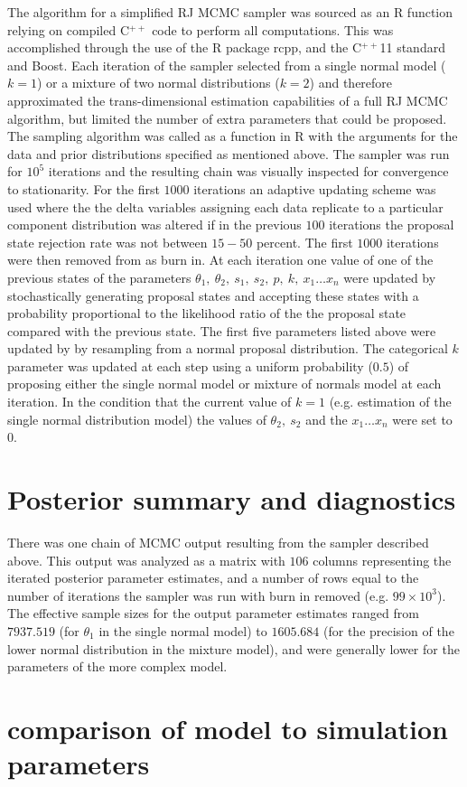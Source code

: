 \documentclass[12pt]{article}
\begin{document}
The algorithm for a simplified RJ MCMC sampler was sourced as an R function relying on compiled C$^{++}$ code  to perform all computations. This was accomplished through the use of the R package rcpp, and the C$^{++}$11 standard and Boost. Each iteration of the sampler selected from a single normal model ($k=1$) or a mixture of two normal distributions ($k=2$) and therefore approximated the trans-dimensional estimation capabilities of a full RJ MCMC algorithm, but limited the number of extra parameters that could be proposed.
The sampling algorithm was called as a function in R with the arguments for the data and prior distributions specified as mentioned above. The sampler was run for $10^5$ iterations and the resulting chain was visually inspected for convergence to stationarity.  For the first $1000$ iterations an adaptive updating scheme was used where the the delta variables assigning each data replicate to a particular component distribution was altered if in the previous $100$ iterations the proposal state rejection rate was not  between $15 - 50$ percent. The first $1000$ iterations were then removed from as burn in. 
At each iteration one value of one of the previous states of the parameters $\theta_1, \ \theta_2, \ s_1, \ s_2, \ p, \ k, \ x_1 \ldots x_n $ were updated by stochastically generating proposal states and accepting these states with a probability proportional to the likelihood ratio of the the proposal state compared with the previous state. The first five parameters listed above were updated by by resampling from a normal proposal distribution. The categorical $k$ parameter was updated at each step using a uniform probability ($0.5$) of proposing either the single normal model or mixture of normals model at each iteration. In the condition that the current value of $k = 1$ (e.g. estimation of the single normal distribution model) the values of $\theta_2, \ s_2$ and the $x_1 \ldots x_n$ were set to 0. 




\section*{Posterior summary and diagnostics}
There was one chain of MCMC output resulting from the sampler described above. This output was analyzed as a matrix with $106$ columns representing the iterated posterior parameter estimates, and a number of rows  equal to the number of iterations the sampler was run with burn in removed (e.g. $99\times10^3$). 
The effective sample sizes for the output parameter estimates ranged from $7937.519$ (for $\theta_1$ in the single normal model) to $1605.684$ (for the precision of the lower normal distribution in the mixture model), and were generally lower for the parameters of the more complex model.



\section*{comparison of model to simulation parameters}
\end{document}
